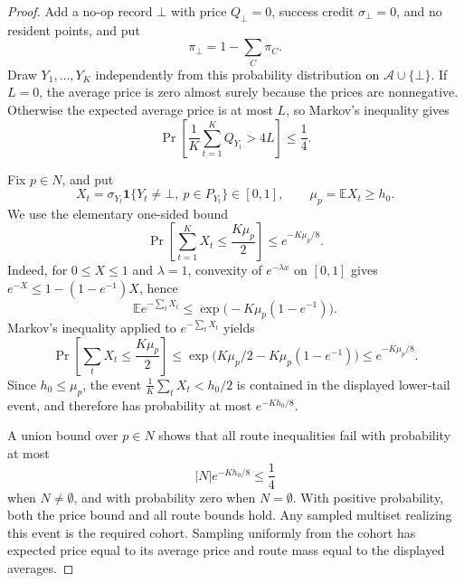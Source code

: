 \documentclass[10pt]{article}
\theoremstyle{definition}
\newcommand{\E}{\mathbb{E}}
\begin{document}
\begin{proof}
   Add a no-op record \(\bot\) with price \(Q_\bot=0\), success credit
   \(\sigma_\bot=0\), and no resident points, and put
   \[
      \pi_\bot=1-\sum_C\pi_C .
   \]
   Draw \(Y_1,\ldots,Y_K\) independently from this probability distribution on
   \(\mathcal A\cup\{\bot\}\).  If \(L=0\), the average price is zero almost
   surely because the prices are nonnegative.  Otherwise the expected average
   price is at most \(L\), so Markov's inequality gives
   \[
      \Pr\left[\frac1K\sum_{t=1}^KQ_{Y_t}>4L\right]\le\frac14 .
   \]

   Fix \(p\in N\), and put
   \[
      X_t=\sigma_{Y_t}\mathbf 1\{Y_t\ne\bot,\ p\in P_{Y_t}\}\in[0,1],
      \qquad \mu_p=\E X_t\ge h_0 .
   \]
   We use the elementary one-sided bound
   \[
      \Pr\left[\sum_{t=1}^KX_t\le\frac{K\mu_p}{2}\right]
      \le e^{-K\mu_p/8}.
   \]
   Indeed, for \(0\le X\le1\) and \(\lambda=1\),
   convexity of \(e^{-\lambda x}\) on \([0,1]\) gives
   \(e^{-X}\le1-(1-e^{-1})X\), hence
   \[
      \E e^{-\sum_tX_t}
      \le
      \exp\bigl(-K\mu_p(1-e^{-1})\bigr).
   \]
   Markov's inequality applied to \(e^{-\sum_tX_t}\) yields
   \[
      \Pr\left[\sum_tX_t\le\frac{K\mu_p}{2}\right]
      \le
      \exp\bigl(K\mu_p/2-K\mu_p(1-e^{-1})\bigr)
      \le e^{-K\mu_p/8}.
   \]
   Since \(h_0\le\mu_p\), the event
   \(\frac1K\sum_tX_t<h_0/2\) is contained in the displayed lower-tail event,
   and therefore has probability at most \(e^{-Kh_0/8}\).

   A union bound over \(p\in N\) shows that all route inequalities fail with
   probability at most
   \[
      |N|e^{-Kh_0/8}\le\frac14
   \]
   when \(N\ne\emptyset\), and with probability zero when \(N=\emptyset\).
   With positive probability, both the price bound and all route bounds hold.
   Any sampled multiset realizing this event is the required cohort.  Sampling
   uniformly from the cohort has expected price equal to its average price and
   route mass equal to the displayed averages.
\end{proof}
\end{document}
